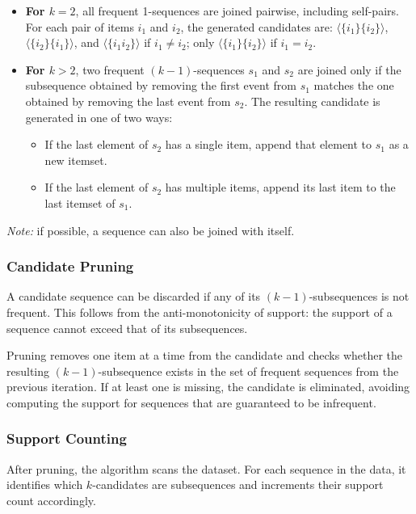 \begin{itemize}
    \item \textbf{For $k = 2$}, all frequent 1-sequences are joined pairwise, including self-pairs. For each pair of items $i_1$ and $i_2$, the generated candidates are: $\langle\{i_1\} \{i_2\}\rangle$, $\langle\{i_2\} \{i_1\}\rangle$, and $\langle\{i_1 i_2\}\rangle$ if $i_1 \neq i_2$; only $\langle\{i_1\} \{i_2\}\rangle$ if $i_1 = i_2$.

    \item \textbf{For $k > 2$}, two frequent $(k{-}1)$-sequences $s_1$ and $s_2$ are joined only if the subsequence obtained by removing the first event from $s_1$ matches the one obtained by removing the last event from $s_2$. The resulting candidate is generated in one of two ways:
    \begin{itemize}
        \item If the last element of $s_2$ has a single item, append that element to $s_1$ as a new itemset.
        \item If the last element of $s_2$ has multiple items, append its last item to the last itemset of $s_1$.
    \end{itemize}
\end{itemize}

\textit{Note:} if possible, a sequence can also be joined with itself. 

\subsubsection{Candidate Pruning}

A candidate sequence can be discarded if any of its $(k{-}1)$-subsequences is not frequent. This follows from the anti-monotonicity of support: the support of a sequence cannot exceed that of its subsequences.

Pruning removes one item at a time from the candidate and checks whether the resulting $(k{-}1)$-subsequence exists in the set of frequent sequences from the previous iteration. If at least one is missing, the candidate is eliminated, avoiding computing the support for sequences that are guaranteed to be infrequent.

\subsubsection{Support Counting}

After pruning, the algorithm scans the dataset. For each sequence in the data, it identifies which $k$-candidates are subsequences and increments their support count accordingly.

